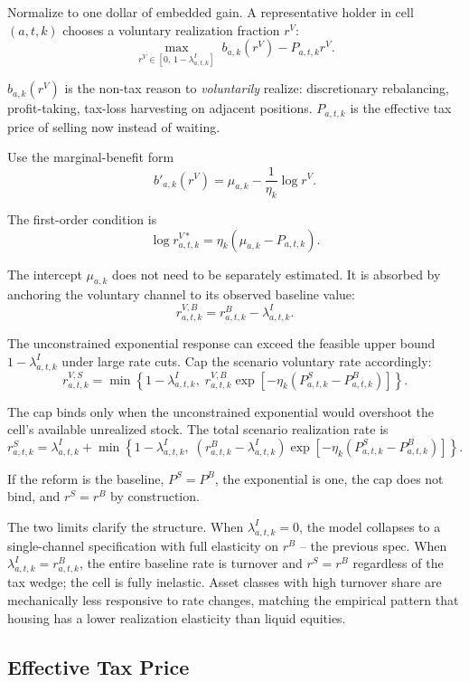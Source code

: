 \documentclass[11pt]{article}
\begin{document}
Normalize to one dollar of embedded gain. A representative holder in cell
$(a,t,k)$ chooses a voluntary realization fraction $r^V$:
\[
\max_{r^V \in [0,\,1-\lambda^I_{a,t,k}]} \; b_{a,k}(r^V) - P_{a,t,k} r^V.
\]

$b_{a,k}(r^V)$ is the non-tax reason to \emph{voluntarily} realize:
discretionary rebalancing, profit-taking, tax-loss harvesting on adjacent
positions. $P_{a,t,k}$ is the effective tax price of selling now instead of
waiting.

Use the marginal-benefit form
\[
b'_{a,k}(r^V) = \mu_{a,k} - \frac{1}{\eta_k}\log r^V.
\]

The first-order condition is
\[
\log r^{V*}_{a,t,k} = \eta_k(\mu_{a,k} - P_{a,t,k}).
\]

The intercept $\mu_{a,k}$ does not need to be separately estimated. It is
absorbed by anchoring the voluntary channel to its observed baseline value:
\[
r^{V,B}_{a,t,k} = r^B_{a,t,k} - \lambda^I_{a,t,k}.
\]

The unconstrained exponential response can exceed the feasible upper
bound $1-\lambda^I_{a,t,k}$ under large rate cuts. Cap the scenario
voluntary rate accordingly:
\[
r^{V,S}_{a,t,k}
=
\min\!\left\{
1-\lambda^I_{a,t,k},\;
r^{V,B}_{a,t,k}
\exp\!\left[-\eta_k\left(P^S_{a,t,k}-P^B_{a,t,k}\right)\right]
\right\}.
\]

The cap binds only when the unconstrained exponential would overshoot the
cell's available unrealized stock. The total scenario realization rate is
\[
\boxed{
r^S_{a,t,k}
=
\lambda^I_{a,t,k}
+
\min\!\left\{
1-\lambda^I_{a,t,k},\;
\left(r^B_{a,t,k}-\lambda^I_{a,t,k}\right)
\exp\!\left[-\eta_k\left(P^S_{a,t,k}-P^B_{a,t,k}\right)\right]
\right\}.
}
\]

If the reform is the baseline, $P^S=P^B$, the exponential is one, the cap
does not bind, and $r^S=r^B$ by construction.

The two limits clarify the structure. When $\lambda^I_{a,t,k}=0$, the model
collapses to a single-channel specification with full elasticity on
$r^B$ -- the previous spec. When $\lambda^I_{a,t,k}=r^B_{a,t,k}$, the
entire baseline rate is turnover and $r^S=r^B$ regardless of the tax
wedge; the cell is fully inelastic. Asset classes with high turnover
share are mechanically less responsive to rate changes, matching the
empirical pattern that housing has a lower realization elasticity than
liquid equities.

\subsection{Effective Tax Price}
\end{document}
